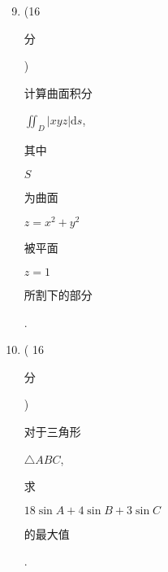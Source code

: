\documentclass[10pt]{article}
\begin{document}
\begin{enumerate}
  \setcounter{enumi}{8}
  \item (16 \begin{CJK}{UTF8}{mj}分\end{CJK}) \begin{CJK}{UTF8}{mj}计算曲面积分\end{CJK} $\iint_{D}|x y z| \mathrm{d} s$, \begin{CJK}{UTF8}{mj}其中\end{CJK} $S$ \begin{CJK}{UTF8}{mj}为曲面\end{CJK} $z=x^{2}+y^{2}$ \begin{CJK}{UTF8}{mj}被平面\end{CJK} $z=1$ \begin{CJK}{UTF8}{mj}所割下的部分\end{CJK}.

  \item ( 16 \begin{CJK}{UTF8}{mj}分\end{CJK}) \begin{CJK}{UTF8}{mj}对于三角形\end{CJK} $\triangle A B C$, \begin{CJK}{UTF8}{mj}求\end{CJK} $18 \sin A+4 \sin B+3 \sin C$ \begin{CJK}{UTF8}{mj}的最大值\end{CJK}.

\end{enumerate}
\end{document}
